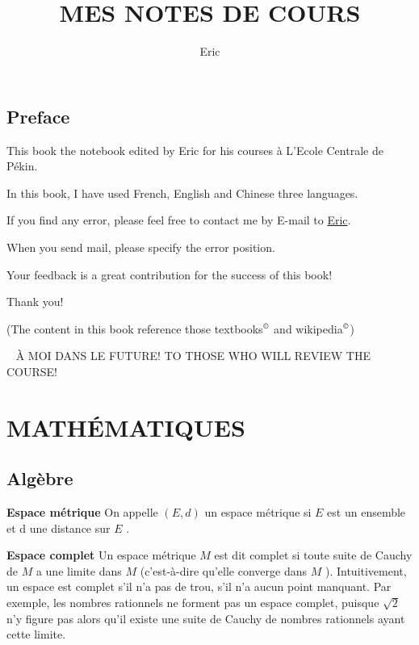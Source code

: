 \documentclass[openany]{book}
\begin{document}
\title{MES NOTES DE COURS}
\author{Eric}
\maketitle
\tableofcontents

\frontmatter
\chapter*{Preface}
This book the notebook edited by Eric for his courses \`a L'Ecole Centrale de P\'ekin. \par
In this book, I have used French, English and Chinese three languages. \par
If you find any error, please feel free to contact me by E-mail to \href{mailto:wangchaogo1990@gmail.com}{Eric}. \par
When you send mail, please specify the error position.\par
Your feedback is a great contribution for the success of this book!\par
Thank you!
\par
(The content in this book reference those textbooks$^\copyright$ and wikipedia$^\copyright$)
\newpage
\begin{center}
\  %
\vfill
\large{\`A MOI DANS LE FUTURE!}
\vskip 1cm
\large{TO THOSE WHO WILL REVIEW THE COURSE!}
\vfill
\end{center}
\mainmatter

\part{MATH\'EMATIQUES}
\chapter{Alg\`ebre}
\textbf{Espace m\'etrique}
On appelle $(E, d)$ un espace m\'etrique si $ E$  est un ensemble et d une distance sur $E$ .

\textbf{Espace complet}
Un espace m\'etrique $ M$  est dit complet si toute suite de Cauchy de $ M$  a une limite dans $ M$  (c'est-\`a-dire qu'elle converge dans $M$ ).\newline
Intuitivement, un espace est complet s'il n'a pas de trou, s'il n'a aucun point manquant. \newline
Par exemple, les nombres rationnels ne forment pas un espace complet, puisque $\sqrt{2}$ n'y figure pas alors qu'il existe une suite de Cauchy de nombres rationnels ayant cette limite.
\end{document}
